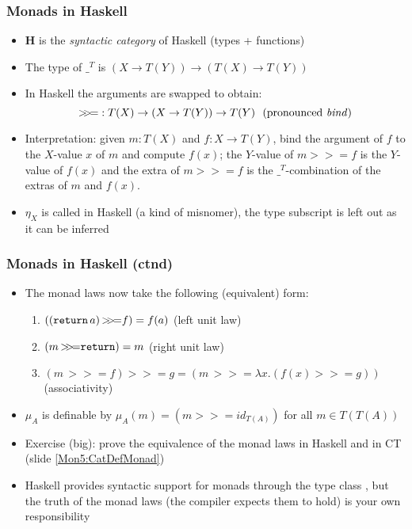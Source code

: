 \documentclass[handout]{beamer}
\newcommand{\bfsf}[1]{{\boldsymbol{#1}}}
\newcommand{\HH}{\bfsf{H}}
\newcommand{\bind}{{>}\!\!{>}\!{=}}
\newcommand{\ttt}[1]{\text{\tt #1}}
\begin{document}
\frame
  {   
    \frametitle{Monads in Haskell}\label{Mon5:MonadHask}

 \begin{itemize}[<+->]
\item $\HH$ is the \emph{syntactic category} of Haskell (types + functions)
\item The type of $\_^T$ is $(X\to T(Y)) \to (T(X)\to T(Y))$
\item In Haskell the arguments are swapped to obtain:
$$\bind : T(X) \to (X\to T(Y)) \to T(Y)~~\text{(pronounced \emph{bind}})$$
\item Interpretation: given $m:T(X)$ and $f: X\to T(Y)$, %
bind the argument of $f$ to the $X$-value $x$ of $m$ and compute $f(x)$;
the $Y$-value of $m\bind f$ is the $Y$-value of $f(x)$ and
the extra of $m\bind f$ is the $\_^T$-combination of 
the extras of $m$ and $f(x)$.
\item $\eta_X$ is called \ttt{return} in Haskell (a kind of misnomer),
the type subscript is left out as it can be inferred


 \end{itemize}

 }

\frame
  {   
    \frametitle{Monads in Haskell (ctnd)}\label{Mon5:MonadHaskCtnd}

 \begin{itemize}[<+->]
\item The monad laws now take the following (equivalent) form:
\begin{enumerate}
    \item $((\ttt{return}\,a)\, \bind f) = f(a)$ (left unit law)
    \item $(m\, \bind \ttt{return}) = m$ (right unit law)
    \item $(m\, \bind f) \bind g = (m\, \bind \lambda x. (f(x) \bind g))$ (associativity)
 \end{enumerate}
\item $\mu_A$ is definable by $\mu_A(m) = (m\bind id_{T(A)})$ for all $m\in T(T(A))$
\item Exercise (big): prove the equivalence of the monad laws in Haskell 
and in CT (slide \ref{Mon5:CatDefMonad})
\item Haskell provides syntactic support for monads through the type class
\href{https://wiki.haskell.org/All_About_Monads}%
{\color{blue}\ttt{Monad}}, but the truth of the monad laws (the compiler expects them to hold)
is your own responsibility
 \end{itemize}

 }
\end{document}
